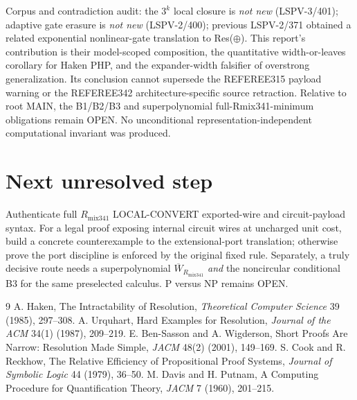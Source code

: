 \documentclass[11pt]{article}
\begin{document}
Corpus and contradiction audit: the \(3^k\) local closure is \emph{not new} (LSPV-3/401); adaptive gate erasure is \emph{not new} (LSPV-2/400); previous LSPV-2/371 obtained a related exponential nonlinear-gate translation to Res(\(\oplus\)). This report's contribution is their model-scoped composition, the quantitative width-or-leaves corollary for Haken PHP, and the expander-width falsifier of overstrong generalization. Its conclusion cannot supersede the REFEREE315 payload warning or the REFEREE342 architecture-specific source retraction. Relative to root MAIN, the B1/B2/B3 and superpolynomial full-Rmix341-minimum obligations remain OPEN. No unconditional representation-independent computational invariant was produced.

\section*{Next unresolved step}
Authenticate full \(R_{\mathrm{mix341}}\) LOCAL-CONVERT exported-wire and circuit-payload syntax. For a legal proof exposing internal circuit wires at uncharged unit cost, build a concrete counterexample to the extensional-port translation; otherwise prove the port discipline is enforced by the original fixed rule. Separately, a truly decisive route needs a superpolynomial \(\overline W_{R_{\mathrm{mix341}}}\) \emph{and} the noncircular conditional B3 for the same preselected calculus. P versus NP remains OPEN.

\begin{thebibliography}{9}
 A. Haken, The Intractability of Resolution, \emph{Theoretical Computer Science} 39 (1985), 297--308.
 A. Urquhart, Hard Examples for Resolution, \emph{Journal of the ACM} 34(1) (1987), 209--219.
 E. Ben-Sasson and A. Wigderson, Short Proofs Are Narrow: Resolution Made Simple, \emph{JACM} 48(2) (2001), 149--169.
 S. Cook and R. Reckhow, The Relative Efficiency of Propositional Proof Systems, \emph{Journal of Symbolic Logic} 44 (1979), 36--50.
 M. Davis and H. Putnam, A Computing Procedure for Quantification Theory, \emph{JACM} 7 (1960), 201--215.
\end{thebibliography}
\end{document}
